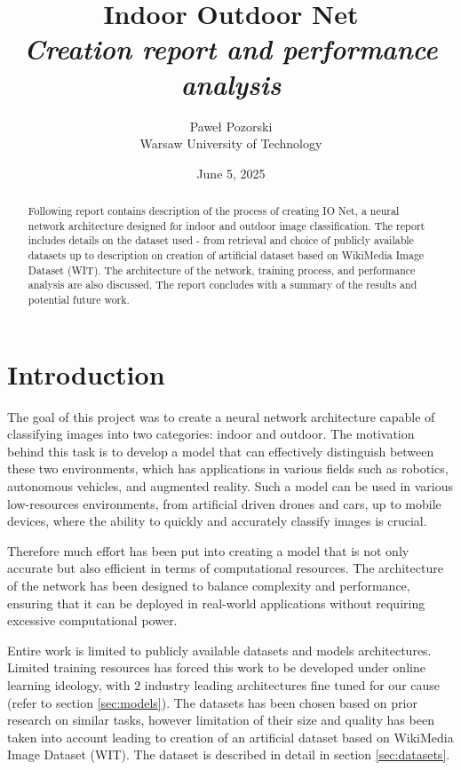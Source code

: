 \documentclass[a4paper]{article}
\title{
    \textbf{I}ndoor \textbf{O}utdoor \textbf{Net} \\
    \textit{Creation report and performance analysis} \\}
\author{Paweł Pozorski \\ Warsaw University of Technology}
\date{June 5, 2025}
\begin{document}
\maketitle
\begin{abstract}
    Following report contains description of the process of creating IO Net, a neural network architecture designed for indoor and outdoor image classification. The report includes details on the dataset used - from retrieval and choice of publicly available datasets up to description on creation of artificial dataset based on WikiMedia Image Dataset (WIT). The architecture of the network, training process, and performance analysis are also discussed. The report concludes with a summary of the results and potential future work.
\end{abstract}

\newpage
\tableofcontents
\newpage

\section{Introduction}

The goal of this project was to create a neural network architecture capable of classifying images into two categories: indoor and outdoor. The motivation behind this task is to develop a model that can effectively distinguish between these two environments, which has applications in various fields such as robotics, autonomous vehicles, and augmented reality. Such a model can be used in various low-resources environments, from  artificial driven drones and cars, up to mobile devices, where the ability to quickly and accurately classify images is crucial.

Therefore much effort has been put into creating a model that is not only accurate but also efficient in terms of computational resources. The architecture of the network has been designed to balance complexity and performance, ensuring that it can be deployed in real-world applications without requiring excessive computational power.

Entire work is limited to publicly available datasets and models architectures. Limited training resources has forced this work to be developed under online learning ideology, with $2$ industry leading architectures fine tuned for our cause (refer to section \ref{sec:models}). The datasets has been chosen based on prior research on similar tasks, however limitation of their size and quality has been taken into account leading to creation of an artificial dataset based on WikiMedia Image Dataset (WIT). The dataset is described in detail in section \ref{sec:datasets}.
\end{document}

